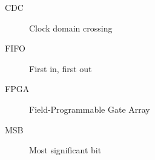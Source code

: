 \Abbreviations %
\begin{description}
\item [CDC] Clock domain crossing
\item [FIFO] First in, first out
\item [FPGA] Field-Programmable Gate Array
\item [MSB] Most significant bit
\end{description}

